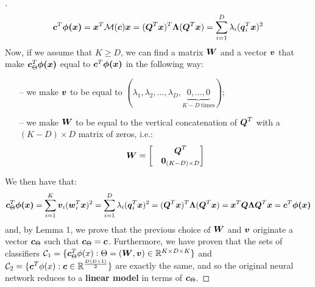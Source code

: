 \documentclass{exam}
\begin{document}
\begin{questions}
\begin{proof}[\unskip\nopunct]
        \[
            \vb*{c}^T \vb*{\phi(x)} =  \vb*{x}^T \mathcal{M}(\vb*{c}) \vb*{x} = (\vb*{Q}^T \vb*{x})^T \vb*{\Lambda} (\vb*{Q}^T \vb*{x}) = \sum_{i = 1}^{D} \lambda_i (\vb*{q}_i^T\vb*{x})^2
        \]
        Now, if we assume that $K \ge D$, we can find a matrix $\vb*{W}$ and a vector $\vb*{v}$ that make $\vb*{c}^T_{\Theta} \vb*{\phi(x)}$ equal to $\vb*{c}^T \vb*{\phi(x)}$ in the following way:
        \begin{itemize}
            \item[--] we make $\vb*{v}$ to be equal to $(\lambda_1, \lambda_2, \dots, \lambda_D, \underbrace{0, \dots, 0}_{K - D \: \text{times}})$;
            \item[--] we make $\vb*{W}$ to be equal to the vertical concatenation of $\vb*{Q}^T$ with a $(K - D) \times D$ matrix of zeros, i.e.:
            \begin{align*}
            \vb*{W} = 
                \begin{bmatrix}
                    &\vb*{Q}^T \\
                    &\vb*{0}_{(K - D) \times D}
                \end{bmatrix}
            \end{align*}
        \end{itemize}
        We then have that:
        \[
            \vb*{c}^T_{\Theta} \vb*{\phi(x)} = \sum_{i = 1}^{K} \vb*{v}_i (\vb*{w}_i^T\vb*{x})^2 =  \sum_{i = 1}^{D} \lambda_i (\vb*{q}_i^T\vb*{x})^2 = (\vb*{Q}^T \vb*{x})^T \vb*{\Lambda} (\vb*{Q}^T \vb*{x}) = \vb*{x}^T \vb*{Q} \vb*{\Lambda}\vb*{Q}^T \vb*{x} = \vb*{c}^T \vb*{\phi(x)}
        \]
        and, by Lemma 1, we prove that the previous choice of $\vb*{W}$ and $\vb*{v}$ originate a vector $\vb*{c}_{\Theta}$ such that $\vb*{c}_{\Theta} = \vb*{c}$. Furthermore, we have proven that the sets of classifiers $\mathcal{C}_1 = \{\vb*{c}_{\Theta}^T\phi(x) : \Theta = (\vb*{W}, \vb*{v}) \in \mathbb{R}^{K \times D \times K}\}$ and $\mathcal{C}_2 = \{\vb*{c}^T\phi(x) : \vb*{c} \in \mathbb{R}^{\frac{D(D + 1)}{2}}\}$ are exactly the same, and so the original neural network reduces to a \textbf{linear model} in terms of $\vb*{c}_{\Theta}$.
        \end{proof}

\end{questions}
\end{document}
